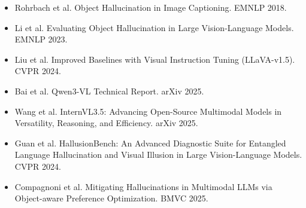 \documentclass[11pt,a4paper]{article}
\begin{document}
\begin{itemize}
    \item Rohrbach et al. Object Hallucination in Image Captioning. EMNLP 2018.
    \item Li et al. Evaluating Object Hallucination in Large Vision-Language Models. EMNLP 2023.
    \item Liu et al. Improved Baselines with Visual Instruction Tuning (LLaVA-v1.5). CVPR 2024.
    \item Bai et al. Qwen3-VL Technical Report. arXiv 2025.
    \item Wang et al. InternVL3.5: Advancing Open-Source Multimodal Models in Versatility, Reasoning, and Efficiency. arXiv 2025.
    \item Guan et al. HallusionBench: An Advanced Diagnostic Suite for Entangled Language Hallucination and Visual Illusion in Large Vision-Language Models. CVPR 2024.
    \item Compagnoni et al. Mitigating Hallucinations in Multimodal LLMs via Object-aware Preference Optimization. BMVC 2025.
\end{itemize}
\end{document}
